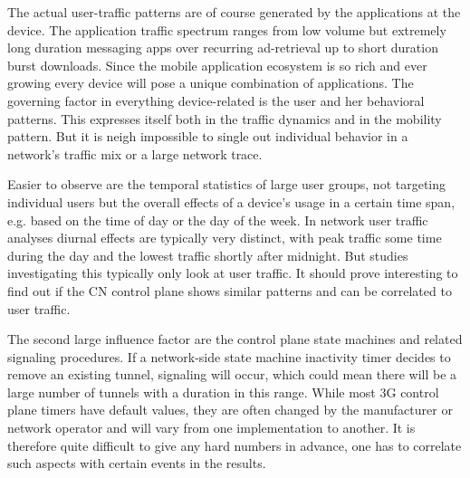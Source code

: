 The actual user-traffic patterns are of course generated by the applications at the device. The application traffic spectrum ranges from low volume but extremely long duration messaging apps over recurring ad-retrieval up to short duration burst downloads. Since the mobile application ecosystem is so rich and ever growing every device will pose a unique combination of applications. The governing factor in everything device-related is the user and her behavioral patterns. This expresses itself both in the traffic dynamics and in the mobility pattern. But it is neigh impossible to single out individual behavior in a network's traffic mix or a large network trace.

Easier to observe are the temporal statistics of large user groups, not targeting individual users but the overall effects of a device's usage in a certain time span, e.g. based on the time of day or the day of the week. In network user traffic analyses diurnal effects are typically very distinct, with peak traffic some time during the day and the lowest traffic shortly after midnight. But studies investigating this typically only look at user traffic. It should prove interesting to find out if the \gls{CN} control plane shows similar patterns and can be correlated to user traffic.

The second large influence factor are the control plane state machines and related signaling procedures. If a network-side state machine inactivity timer decides to remove an existing tunnel, signaling will occur, which could mean there will be a large number of tunnels with a duration in this range. While most \gls{3G} control plane timers have default values, they are often changed by the manufacturer or network operator and will vary from one implementation to another. It is therefore quite difficult to give any hard numbers in advance, one has to correlate such aspects with certain events in the results.





